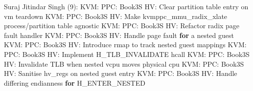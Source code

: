 \documentclass[landscape, 14pt]{report}
\newenvironment{Shaded}{}{}
\newcommand{\DecValTok}[1]{\textcolor[rgb]{0.25,0.63,0.44}{#1}}
\newcommand{\ControlFlowTok}[1]{\textcolor[rgb]{0.00,0.44,0.13}{\textbf{#1}}}
\newcommand{\NormalTok}[1]{#1}
\begin{document}
\begin{Shaded}
\begin{Highlighting}[]
\NormalTok{Suraj Jitindar Singh (}\DecValTok{9}\NormalTok{):}
\NormalTok{      KVM: PPC: Book3S HV: Clear partition table entry on vm teardown}
\NormalTok{      KVM: PPC: Book3S HV: Make kvmppc_mmu_radix_xlate process/partition table agnostic}
\NormalTok{      KVM: PPC: Book3S HV: Refactor radix page fault handler}
\NormalTok{      KVM: PPC: Book3S HV: Handle page fault }\ControlFlowTok{for}\NormalTok{ a nested guest}
\NormalTok{      KVM: PPC: Book3S HV: Introduce rmap to track nested guest mappings}
\NormalTok{      KVM: PPC: Book3S HV: Implement H_TLB_INVALIDATE hcall}
\NormalTok{      KVM: PPC: Book3S HV: Invalidate TLB when nested vcpu moves physical cpu}
\NormalTok{      KVM: PPC: Book3S HV: Sanitise hv_regs on nested guest entry}
\NormalTok{      KVM: PPC: Book3S HV: Handle differing endianness }\ControlFlowTok{for}\NormalTok{ H_ENTER_NESTED}


\end{Highlighting}
\end{Shaded}
\end{document}
